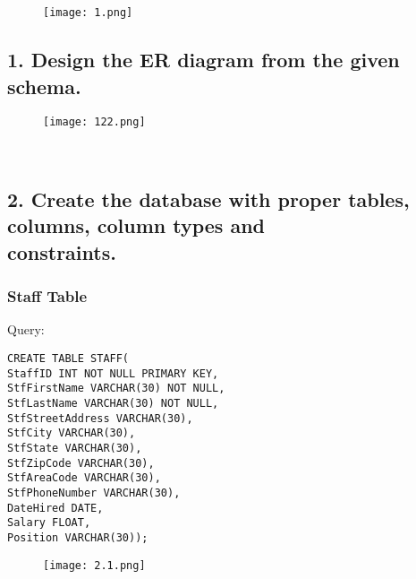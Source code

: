 \documentclass{article}
\begin{document}
\section*{}
\begin{figure}[h!]
    \centering
    \texttt{[image: 1.png]} %
    \label{fig:schema}
\end{figure}
\subsection*{1.  Design the ER diagram from the given schema.}
\begin{figure}[h!]
    \centering
    \texttt{[image: 122.png]} %
    \label{fig:schema}
\end{figure}
\\
\newpage
\subsection*{2. Create the database with proper tables, columns, column types and \\
constraints.}

\subsubsection*{Staff Table}
Query:
\begin{Verbatim}[frame=single,framerule=1pt,fontfamily=courier,fontsize=\small]
CREATE TABLE STAFF(
StaffID INT NOT NULL PRIMARY KEY,
StfFirstName VARCHAR(30) NOT NULL,
StfLastName VARCHAR(30) NOT NULL,
StfStreetAddress VARCHAR(30),
StfCity VARCHAR(30),
StfState VARCHAR(30),
StfZipCode VARCHAR(30),
StfAreaCode VARCHAR(30),
StfPhoneNumber VARCHAR(30),
DateHired DATE,
Salary FLOAT,
Position VARCHAR(30));
\end{Verbatim}%
\begin{figure}[h] %
    \centering
    \texttt{[image: 2.1.png]}
\end{figure}
\end{document}
